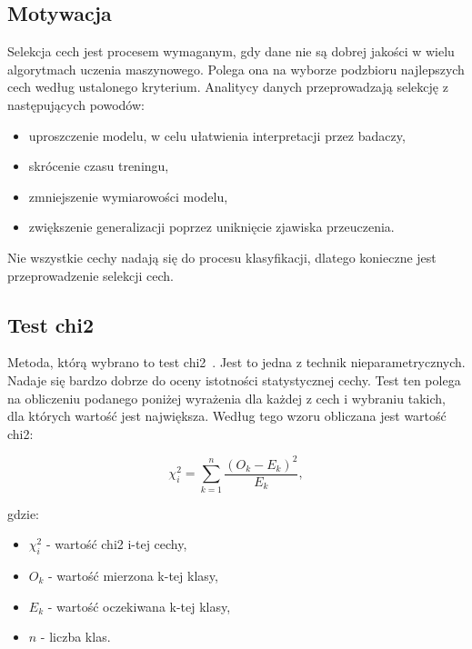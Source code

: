     \subsection{Motywacja}\label{subsec:motywacja}

    Selekcja cech jest procesem wymaganym, gdy dane nie są dobrej jakości w wielu algorytmach uczenia maszynowego.
    Polega ona na wyborze podzbioru najlepszych cech według ustalonego kryterium.
    Analitycy danych przeprowadzają selekcję z następujących powodów:
    \begin{itemize}
        \item uproszczenie modelu, w celu ułatwienia interpretacji przez badaczy,
        \item skrócenie czasu treningu,
        \item zmniejszenie wymiarowości modelu,
        \item zwiększenie generalizacji poprzez uniknięcie zjawiska przeuczenia.
    \end{itemize}

    Nie wszystkie cechy nadają się do procesu klasyfikacji, dlatego konieczne jest przeprowadzenie selekcji cech.

    \subsection{Test chi2}\label{subsec:testChi2}

    Metoda, którą wybrano to test chi2~\cite{chi2}.
    Jest to jedna z technik nieparametrycznych.
    Nadaje się bardzo dobrze do oceny istotności statystycznej cechy.
    Test ten polega na obliczeniu podanego poniżej wyrażenia dla każdej z cech i wybraniu takich, dla których wartość jest największa.
    Według tego wzoru obliczana jest wartość chi2:

    \begin{equation}
        \chi^2_i = \sum_{k=1}^{n}{ \frac{{(O_k - E_k) ^ 2}}{E_k}},
    \end{equation}

    gdzie:
    \begin{itemize}
        \item $\chi^2_i$ - wartość chi2 i-tej cechy,
        \item $O_k$ - wartość mierzona k-tej klasy,
        \item $E_k$ - wartość oczekiwana k-tej klasy,
        \item $n$ - liczba klas.
    \end{itemize}

